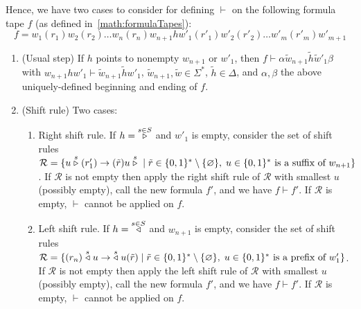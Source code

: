 Hence, we have two cases to consider for defining $\vdash$ on the following formula tape $f$ (as defined in~\eqref{math:formulaTapes}):
$$f = w_1(r_1)w_2(r_2)\dots w_n(r_n) w_{n+1} h w'_1(r'_1)w'_2(r'_2)\dots w'_m(r'_m) w'_{m+1}$$

\begin{enumerate}
    \item (Usual step) If $h$ points to nonempty $w_{n+1}$ or $w'_1$, then $f \vdash \alpha \tilde{w}_{n+1} \tilde{h} \tilde{w}'_1\beta$ with $w_{n+1} h w'_1 \vdash \tilde{w}_{n+1} \tilde{h} w'_1$, $\tilde{w}_{n+1}, \tilde{w} \in \Sigma^*$, $\tilde{h} \in \Delta$, and $\alpha, \beta$ the above uniquely-defined beginning and ending of $f$.
    \item (Shift rule) Two cases:
          \begin{enumerate}

              \item Right shift rule. If $h=\;\stackrel{s\in S}\triangleright$ and $w'_1$ is empty, consider the set of shift rules $\mathcal{R} = \{ u \stackrel{s}\triangleright(r'_1) \to (\tilde{r})u\stackrel{s}\triangleright \; | \; \tilde{r}\in\{0,1\}^*\setminus\{\varnothing\},\; u\in\{0,1\}^* \text{ is a suffix of } w_{n+1}\}$. If $\mathcal{R}$ is not empty then apply the right shift rule of $\mathcal{R}$ with smallest $u$ (possibly empty), call the new formula $f'$, and we have $f \vdash f'$. If $\mathcal{R}$ is empty, $\vdash$ cannot be applied on $f$.
              \item Left shift rule. If $h=\;\stackrel{s\in S}\triangleleft$ and $w_{n+1}$ is empty, consider the set of shift rules $\mathcal{R} = \{ (r_{n})\stackrel{s}\triangleleft u \to \;\stackrel{s}\triangleleft u(\tilde{r}) \; | \; \tilde{r}\in\{0,1\}^*\setminus\{\varnothing\},\; u\in\{0,1\}^* \text{ is a prefix of } w'_{1}\}$. If $\mathcal{R}$ is not empty then apply the left shift rule of $\mathcal{R}$ with smallest $u$ (possibly empty), call the new formula $f'$, and we have $f \vdash f'$. If $\mathcal{R}$ is empty, $\vdash$ cannot be applied on $f$.

          \end{enumerate}

\end{enumerate}

